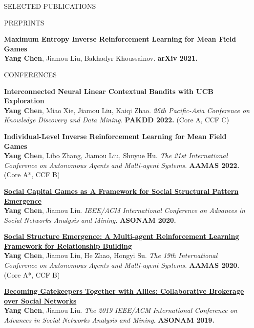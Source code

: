 \documentclass{resume} %
\begin{document}
\begin{rSection}{SELECTED PUBLICATIONS}
\begin{rSubsection}{PREPRINTS}{}{}{}
	\item {\bf Maximum Entropy Inverse Reinforcement Learning for Mean Field Games}\\
		\textbf{Yang Chen}, Jiamou Liu, Bakhadyr Khoussainov. \textbf{arXiv 2021.}
\end{rSubsection}
\begin{rSubsection}{CONFERENCES}{}{}{}
	\item {\bf  Interconnected Neural Linear Contextual Bandits with UCB Exploration}\\
		\textbf{Yang Chen}, Miao Xie, Jiamou Liu, Kaiqi Zhao. {\em 26th Pacific-Asia Conference on Knowledge Discovery and Data Mining.} \textbf{PAKDD 2022.} (Core A, CCF C)
	\item {\bf Individual-Level Inverse Reinforcement Learning for Mean Field Games}\\
		\textbf{Yang Chen}, Libo Zhang, Jiamou Liu, Shuyue Hu. {\em The 21st International Conference on Autonomous Agents and Multi-agent Systems.} \textbf{AAMAS 2022.} (Core A*, CCF B)
	\item {\href{http://www.ifaamas.org/Proceedings/aamas2020/pdfs/p1807.pdf}{\bf Social Capital Games as A Framework for Social Structural Pattern Emergence}}\\ 
		\textbf{Yang Chen}, Jiamou Liu. {\em IEEE/ACM International Conference on Advances in Social Networks Analysis and Mining.} \textbf{ASONAM 2020.}
	\item {\href{http://www.ifaamas.org/Proceedings/aamas2020/pdfs/p1807.pdf}{\bf Social Structure Emergence: A Multi-agent Reinforcement Learning Framework for Relationship Building}}\\ 
		\textbf{Yang Chen}, Jiamou Liu, He Zhao, Hongyi Su. {\em The 19th International Conference on Autonomous Agents and Multi-agent Systems.} \textbf{AAMAS 2020.} (Core A*, CCF B)
	\item {\href{https://github.com/PolynomialTime/ASONAM2019/blob/master/asonam2019.pdf}{\bf Becoming Gatekeepers Together with Allies: Collaborative Brokerage over Social Networks}}\\
		\textbf{Yang Chen}, Jiamou Liu. {\em The 2019 IEEE/ACM International Conference on Advances in Social Networks Analysis and Mining.} \textbf{ASONAM 2019.}

\end{rSubsection}
\end{rSection}
\end{document}
